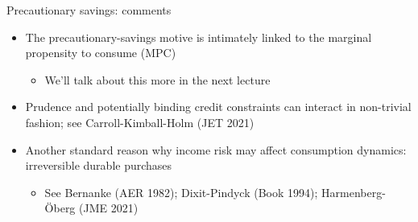 \documentclass[9pt]{beamer}
\newcommand{\bit}{\begin{itemize}}
\newcommand{\eit}{\end{itemize}}
\newcommand{\bc}{\color{blue}}
\begin{document}
\begin{frame}{Precautionary savings: comments}

\bit
\setlength\itemsep{2em}

\item The precautionary-savings motive is intimately linked to the {\bc marginal propensity to consume (MPC)}
\bit
\item We'll talk about this more in the next lecture
\eit

\item Prudence and potentially binding credit constraints can interact in non-trivial fashion; see Carroll-Kimball-Holm (JET 2021)

\item Another standard reason why income risk may affect consumption dynamics: irreversible durable purchases
\bit
\item See Bernanke (AER 1982); Dixit-Pindyck (Book 1994); Harmenberg-\"{O}berg (JME 2021)
\eit

\eit

\end{frame}
\end{document}
